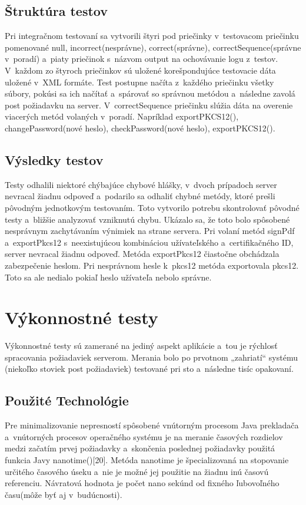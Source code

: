 \documentclass[
  digital, %
  table,   %
oneside,
  nolof,     %
  nolot,     %
]{fithesis3}
\begin{document}
\subsection{Štruktúra testov}
Pri integračnom testovaní sa  vytvorili štyri pod priečinky  v~testovacom priečinku pomenované null, incorrect(nesprávne), correct(správne), correctSequence(správne v~poradí) a~piaty priečinok s~názvom output na ochovávanie logu z~testov. V~každom zo štyroch priečinkov sú uložené korešpondujúce testovacie dáta uložené v~XML formáte. Test postupne načíta z~každého priečinku všetky súbory, pokúsi sa ich načítať a~spárovať so správnou metódou a~následne zavolá post požiadavku na server.  V~correctSequence priečinku slúžia dáta na overenie viacerých metód volaných v~poradí. Napríklad exportPKCS12(), changePassword(nové heslo), checkPassword(nové heslo), exportPKCS12().
\subsection{Výsledky testov}
Testy odhalili niektoré chýbajúce chybové hlášky, v~dvoch prípadoch server nevracal žiadnu odpoveď a~podarilo sa odhaliť chybné metódy, ktoré prešli pôvodným jednotkovým testovaním. Toto vytvorilo potrebu skontrolovať pôvodné testy a~bližšie analyzovať vzniknutú chybu. Ukázalo sa, že toto bolo spôsobené nesprávnym zachytávaním výnimiek na strane servera. Pri volaní metód signPdf a~exportPkcs12 s~neexistujúcou kombináciou užívateľského a~certifikačného ID, server nevracal žiadnu odpoveď. Metóda exportPkcs12 čiastočne obchádzala zabezpečenie heslom. Pri nesprávnom hesle k~pkcs12 metóda exportovala pkcs12. Toto sa ale nedialo pokiaľ heslo užívateľa nebolo správne.
\section{Výkonnostné testy}
Výkonnostné testy sú zamerané na jediný aspekt aplikácie a~tou je rýchlosť spracovania požiadaviek serverom. Merania bolo po prvotnom „zahriatí“ systému (niekoľko stoviek post požiadaviek) testované pri sto a~následne tisíc opakovaní.
\subsection{Použité Technológie}
Pre minimalizovanie nepresností spôsobené vnútorným procesom Java prekladača a~vnútorných procesov operačného systému je na meranie časových rozdielov medzi začatím prvej požiadavky a~skončenia poslednej požiadavky použitá funkcia Javy nanotime()[20]. Metóda nanotime je špecializovaná na stopovanie určitého časového úseku a~nie je možné jej použitie na žiadnu inú časovú referenciu. Návratová hodnota je počet nano sekúnd od fixného ľubovoľného času(môže byť aj v~budúcnosti).
\end{document}
